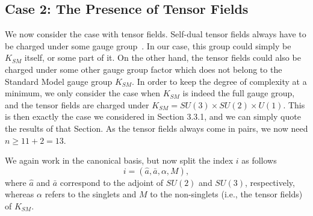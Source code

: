 \documentclass[a4paper,11pt]{article}
\begin{document}
\subsection{Case 2: The Presence of Tensor Fields}

We now consider the case with tensor fields. Self-dual tensor fields
always have to be charged under some gauge group~\cite{GZ1}. 
In our case, this group 
could simply be $K_{SM}$ itself, or some part of it. On the other hand, 
the tensor fields
could also be charged under some other gauge group factor which does not belong
to the Standard Model gauge group $K_{SM}$. In order to keep the 
degree of complexity at a minimum, we only consider the case 
when $K_{SM}$ is indeed the full gauge group, and  
the tensor fields are charged under $K_{SM}=SU(3)\times SU(2)\times U(1)$.
This is then exactly the case we considered in Section 3.3.1,
and we can simply quote the results of that Section.
As the tensor fields always come in pairs, we now need $n\geq 11+2=13$.

We again work in the canonical basis, but now 
split the index $i$ as follows
\begin{equation}
i=(\hat{a},\bar{a},\alpha,M),
\end{equation}
where $\hat{a}$ and $\bar{a}$ correspond to the adjoint of
$SU(2)$ and  $SU(3)$, respectively, whereas $\alpha$ refers to the
singlets and
$M$ to the non-singlets (i.e., the tensor fields) of $K_{SM}$.
\end{document}
